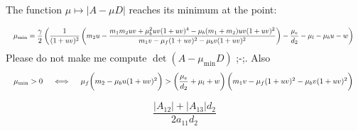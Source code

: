 \begin{remark}[Minimum] The function $\mu \longmapsto |A - \mu D|$ reaches its minimum at the point:
	
\begin{equation}
	\resizebox{\hsize}{!}{%
		$\mu_{\mathbf{\mathrm{min}}} = \dfrac{\gamma}{2}\left( \dfrac{1}{(1+uv)^2}\left( m_2 u -  \dfrac{m_1m_2uv + \mu_b^2 uv(1+uv)^4 - \mu_b(m_1 + m_2) uv(1+uv)^2}{m_1 v - \mu_f (1 + uv)^2 - \mu_b v(1+uv)^2} \right)-\dfrac{\mu_e}{d_2} - \mu_l - \mu_b u - w\right) \notag$  
	}
\end{equation}
Please do not make me compute $\det(A - \mu_{\textrm{min}} D)$ ;-;. Also
\begin{equation}
	\resizebox{\hsize}{!}{%
		$\mu_{\mathbf{\mathrm{min}}} > 0 \quad \iff\quad \mu_f \biggl(m_2 - \mu_b u (1 + uv)^2\biggr) > \left( \dfrac{\mu_e}{d_2} + \mu_l + w \right) \biggl( m_1 v - \mu_f(1+uv)^2 - \mu_b v (1 + uv)^2\biggr) \notag$  
	}
\end{equation}
\end{remark}



$$\frac{|A_{12}| + |A_{13}|d_2}{2a_{11} d_2}$$


